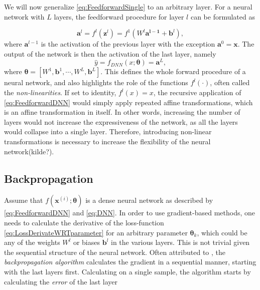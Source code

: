 We will now generalize \autoref{eq:FeedforwardSingle} to an arbitrary layer. For a neural network with $L$ layers, the feedforward procedure for layer $l$  can be formulated as 

\begin{equation}\label{eq:FeedforwardDNN}
    \boldsymbol{a}^l = f^l(\boldsymbol{z}^l) = f^1(W^l \boldsymbol{a^{l-1}} + \boldsymbol{b}^l),
\end{equation}
where $\boldsymbol{a}^{l-1}$ is the activation of the previous layer with the exception $\boldsymbol{a}^{0} = \boldsymbol{x}$. The output of the network is then the activation of the last layer, namely 
\begin{equation}\label{eq:DNN}
    \hat{y} = f_{DNN}(x;\boldsymbol{\theta}) = \boldsymbol{a}^{L},
\end{equation}
where $\boldsymbol{\theta} = [W^1, \boldsymbol{b}^1, \cdots, W^L,  \boldsymbol{b}^L]$. This defines the whole forward procedure of a neural network, and also highlights the role of the functions $f^l(\cdot)$, often called the \emph{non-linearities}. If set to identity, $f^l(x) = x$, the recursive application of \autoref{eq:FeedforwardDNN} would simply apply repeated affine transformations, which is an affine transformation in itself. In other words, increasing the number of layers would not increase the expressiveness of the network, as all the layers would collapse into a single layer. Therefore, introducing non-linear transformations is necessary to increase the flexibility of the neural network(kilde?). 

\subsection{Backpropagation}\label{sec:BackpropogationDNN}


Assume that $f(\boldsymbol{x}^{(i)}; \boldsymbol{\theta})$ is a dense neural network as described by \autoref{eq:FeedforwardDNN} and \autoref{eq:DNN}. In order to use gradient-based methods, one needs to calculate the derivative of the loss-function \autoref{eq:LossDerivateWRTparameter} for an arbitrary parameter $\boldsymbol{\theta}_k$, which could be any of the weights $W^l$ or biases $\boldsymbol{b}^l$ in the various layers. This is not trivial given the sequential structure of the neural network. Often attributed to \citet{Rumelhart}, the \emph{backpropagation algorithm} calculates the gradient in a sequential manner, starting with the last layers first. Calculating on a single sample, the algorithm starts by calculating the \emph{error} of the last layer


